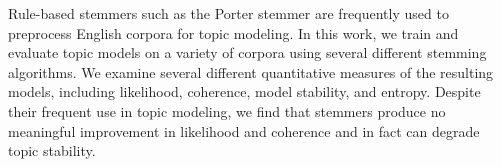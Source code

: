 Rule-based stemmers such as the Porter stemmer are frequently used to preprocess English corpora for topic modeling. In this work, we train and evaluate topic models on a variety of corpora using several different stemming algorithms. We examine several different quantitative measures of the resulting models, including likelihood, coherence, model stability, and entropy. Despite their frequent use in topic modeling, we find that stemmers produce no meaningful improvement in likelihood and coherence and in fact can degrade topic stability.
